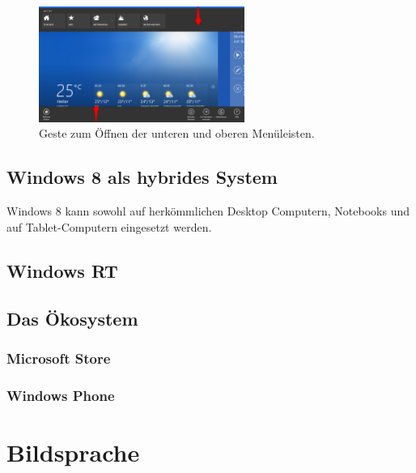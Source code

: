 \documentclass[12pt,a4paper,bibtotoc]{scrartcl}
\begin{document}
\begin{figure}[h]	
	\centering
	\includegraphics[width=0.6\textwidth]{Bilder/Screenshots/windows8/app_leisten.png} 
	\caption{Geste zum Öffnen der unteren und oberen Menüleisten.}
	\label{fig:menubar}
\end{figure}  

\subsection{Windows 8 als hybrides System}
\label{subsec:hybrides system}
Windows 8 kann sowohl auf herkömmlichen Desktop Computern, Notebooks und auf Tablet-Computern eingesetzt werden. 
\subsection{Windows RT}
\label{subsec:winRT}
\subsection{Das Ökosystem}
\label{subsec:ökosystem}
\subsubsection{Microsoft Store}
\label{subsubsec:store}
\subsubsection{Windows Phone}
\label{subsubsec:windowsphone}

\newpage
\section{Bildsprache}

\newpage
\end{document}
